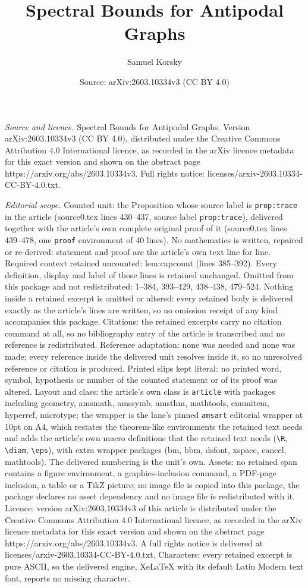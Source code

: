 \documentclass[10pt,a4paper]{amsart}
\title[Spectral Bounds for Antipodal Graphs]{Spectral Bounds for Antipodal Graphs}
\author{Samuel Korsky}
\date{Source: arXiv:2603.10334v3 (CC BY 4.0)}
\begin{document}
\maketitle

\noindent\emph{Source and licence.} Spectral Bounds for Antipodal Graphs. Version arXiv:2603.10334v3 (CC BY 4.0), distributed under the Creative Commons Attribution 4.0 International licence, as recorded in the arXiv licence metadata for this exact version and shown on the abstract page https://arxiv.org/abs/2603.10334v3. Full rights notice: licenses/arxiv-2603.10334-CC-BY-4.0.txt.\par\smallskip

\noindent\textit{Editorial scope.} Counted unit: the Proposition whose source label is \texttt{prop:trace} in the article (source0.tex lines 430--437, source label \texttt{prop:trace}), delivered together with the article's own complete original proof of it (source0.tex lines 439--478, one \texttt{proof} environment of 40 lines). No mathematics is written, repaired or re-derived: statement and proof are the article's own text line for line. Required context retained uncounted: lem:capcount (lines 385--392). Every definition, display and label of those lines is retained unchanged. Omitted from this package and not redistributed: 1--384, 393--429, 438--438, 479--524. Nothing inside a retained excerpt is omitted or altered: every retained body is delivered exactly as the article's lines are written, so no omission receipt of any kind accompanies this package. Citations: the retained excerpts carry no citation command at all, so no bibliography entry of the article is transcribed and no reference is redistributed. Reference adaptation: none was needed and none was made; every reference inside the delivered unit resolves inside it, so no unresolved reference or citation is produced. Printed slips kept literal: no printed word, symbol, hypothesis or number of the counted statement or of its proof was altered. Layout and class: the article's own class is \texttt{article} with packages including geometry, amsmath, amssymb, amsthm, mathtools, enumitem, hyperref, microtype; the wrapper is the lane's pinned \texttt{amsart} editorial wrapper at 10pt on A4, which restates the theorem-like environments the retained text needs and adds the article's own macro definitions that the retained text needs (\texttt{\textbackslash R}, \texttt{\textbackslash diam}, \texttt{\textbackslash eps}), with extra wrapper packages (bm, bbm, dsfont, xspace, cancel, mathtools). The delivered numbering is the unit's own. Assets: no retained span contains a figure environment, a graphics-inclusion command, a PDF-page inclusion, a table or a TikZ picture; no image file is copied into this package, the package declares no asset dependency and no image file is redistributed with it. Licence: version arXiv:2603.10334v3 of this article is distributed under the Creative Commons Attribution 4.0 International licence, as recorded in the arXiv licence metadata for this exact version and shown on the abstract page https://arxiv.org/abs/2603.10334v3. A full rights notice is delivered at licenses/arxiv-2603.10334-CC-BY-4.0.txt. Characters: every retained excerpt is pure ASCII, so the delivered engine, XeLaTeX with its default Latin Modern text font, reports no missing character.
\end{document}
